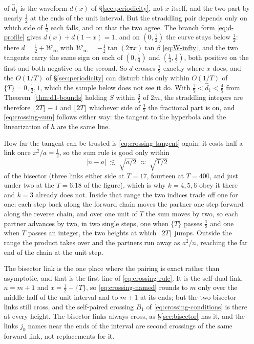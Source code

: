 \documentclass[11pt]{article}
\theoremstyle{definition}
\begin{document}
of $\hat d_1$ is the waveform $d(x)$ of \S\ref{sec:periodicity}, not $x$ itself,
and the two part by nearly $\tfrac12$ at the ends of the unit interval. But the
straddling pair depends only on which side of $\tfrac12$ each falls, and on that
the two agree. The branch form \eqref{eq:d-profile} gives $d(x)+d(1-x)=1$, and
on $(0,\tfrac12)$ the curve stays below $\tfrac12$: there
$d=\tfrac12+\mathcal W_{\infty}$ with
$\mathcal W_{\infty}=-\tfrac12\tan(2\pi x)\tan\beta$ \eqref{eq:W-infty}, and the
two tangents carry the same sign on each of $(0,\tfrac14)$ and
$(\tfrac14,\tfrac12)$, both positive on the first and both negative on the
second. So $d$ crosses
$\tfrac12$ exactly where $x$ does, and the $O(1/T)$ of \S\ref{sec:periodicity}
can disturb this only within $O(1/T)$ of $\{T\}=0,\tfrac12,1$, which the sample
below does not see it do. With $\tfrac15<\hat d_1<\tfrac45$ from
Theorem~\ref{thm:d1-bounds} holding $S$ within $\tfrac35$ of $2m$, the
straddling integers are therefore $\lfloor2T\rfloor-1$ and $\lfloor2T\rfloor$
whichever side of $\tfrac12$ the fractional part is on, and
\eqref{eq:crossing-sum} follows either way: the tangent to the hyperbola and the
linearization of $h$ are the same line.

How far the tangent can be trusted is \eqref{eq:crossing-tangent} again: it
costs half a link once $x^{2}/a=\tfrac12$, so the sum rule is good only within
\begin{equation}\label{eq:crossing-reach}
|n-a|\;\lesssim\;\sqrt{a/2}\;\approx\;\sqrt{T/2}
\end{equation}
of the bisector (three links either side at $T=17$, fourteen at $T=400$, and just
under two at the $T=6.18$ of the figure), which is why $k=4,5,6$ obey it there
and $k=3$ already does not. Inside that range the two indices trade off one for
one: each step back along the forward chain moves the partner one step forward
along the reverse chain, and over one unit of $T$ the sum moves by two, so each
partner advances by two, in two single steps, one when $\{T\}$ passes
$\tfrac12$ and one when $T$ passes an integer, the two heights at which
$\lfloor 2T\rfloor$ jumps. Outside the range the product takes over and the partners run
away as $a^{2}/n$, reaching the far end of the chain at the unit step.

The bisector link is the one place where the pairing is exact rather than
asymptotic, and that is the first line of \eqref{eq:crossing-rule}. It is
the self-dual link, $n=m+1$ and $x=\tfrac12-\{T\}$, so
\eqref{eq:crossing-named} rounds to $m$ only over the middle half of the unit
interval and to $m\mp1$ at its ends; but the two bisector links still cross, and the
self-paired crossing $B_1$ of \eqref{eq:crossing-conditions} is there at every
height. The bisector links always cross, as \S\ref{sec:bisector} has it, and
the links $j_0$ names near the ends of the interval are
second crossings of the same forward link, not replacements for it.
\end{document}
